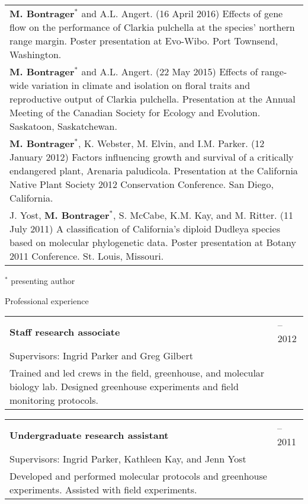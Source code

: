 \documentclass[letterpaper,11pt,oneside]{article}
\begin{document}
\noindent \begin{tabular}{@{} >{\raggedright\arraybackslash}p{16.51cm}}
\textbf{M. Bontrager}$^{*}$ and A.L. Angert. (16 April 2016) Effects of gene flow on the performance of Clarkia pulchella at the species’ northern range margin. Poster presentation at Evo-Wibo. Port Townsend, Washington. \\
\textbf{M. Bontrager}$^{*}$ and A.L. Angert. (22 May 2015) Effects of range-wide variation in climate and isolation on floral traits and reproductive output of Clarkia pulchella. Presentation at the Annual Meeting of the Canadian Society for Ecology and Evolution. Saskatoon, Saskatchewan. \\
\textbf{M. Bontrager}$^{*}$, K. Webster, M. Elvin, and I.M. Parker. (12 January 2012) Factors influencing growth and survival of a critically endangered plant, Arenaria paludicola. Presentation at the California Native Plant Society 2012 Conservation Conference. San Diego, California. \\
J. Yost, \textbf{M. Bontrager}$^{*}$, S. McCabe, K.M. Kay, and M. Ritter. (11 July 2011) A classification of California’s diploid Dudleya species based on molecular phylogenetic data. Poster presentation at Botany 2011 Conference. St. Louis, Missouri. \\
\end{tabular}

\smallskip
\noindent $^{*}$ presenting author 
\bigskip
\bigskip

\newpage


\bgroup
\noindent\Large{Professional experience}  
\normalsize
\bigskip

\normalsize
\noindent \begin{tabular}{@{} >{\raggedright\arraybackslash}p{14.41cm} >{\raggedleft\arraybackslash}p{1.7cm}}
\textbf{Staff research associate} & 2011--2012 \\
 Supervisors: Ingrid Parker and Greg Gilbert & \\
 Trained and led crews in the field, greenhouse, and molecular biology lab. Designed greenhouse experiments and field monitoring protocols. & \\
\end{tabular}
\smallskip

\noindent \begin{tabular}{@{} >{\raggedright\arraybackslash}p{14.41cm} >{\raggedleft\arraybackslash}p{1.7cm}}
 \textbf{Undergraduate research assistant} & 2010--2011 \\
 Supervisors: Ingrid Parker, Kathleen Kay, and Jenn Yost & \\
 Developed and performed molecular protocols and greenhouse experiments.
 Assisted with field experiments. & \\
\end{tabular}
\egroup
\bigskip
\bigskip
\end{document}
